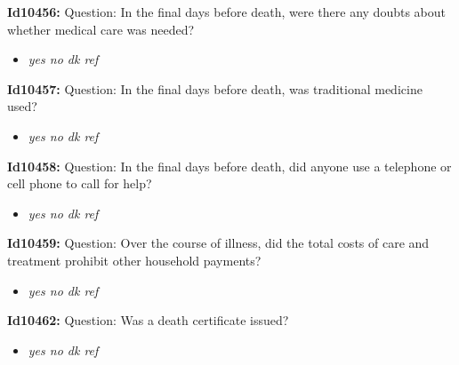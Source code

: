 \documentclass{article}%
\begin{document}
\textbf{Id10456: \newline%
}%
Question: In the final days before death, were there any doubts about whether medical care was needed?\newline%
%
\begin{itemize}%
\item%
\textit{yes\newline%
 no\newline%
 dk\newline%
 ref\newline%
}%
\end{itemize}%
\textbf{Id10457: \newline%
}%
Question: In the final days before death, was traditional medicine used?\newline%
%
\begin{itemize}%
\item%
\textit{yes\newline%
 no\newline%
 dk\newline%
 ref\newline%
}%
\end{itemize}%
\textbf{Id10458: \newline%
}%
Question: In the final days before death, did anyone use a telephone or cell phone to call for help?\newline%
%
\begin{itemize}%
\item%
\textit{yes\newline%
 no\newline%
 dk\newline%
 ref\newline%
}%
\end{itemize}%
\textbf{Id10459: \newline%
}%
Question: Over the course of illness, did the total costs of care and treatment prohibit other household payments?\newline%
%
\begin{itemize}%
\item%
\textit{yes\newline%
 no\newline%
 dk\newline%
 ref\newline%
}%
\end{itemize}%
\textbf{Id10462: \newline%
}%
Question: Was a death certificate issued?\newline%
%
\begin{itemize}%
\item%
\textit{yes\newline%
 no\newline%
 dk\newline%
 ref\newline%
}%
\end{itemize}%
\end{document}
